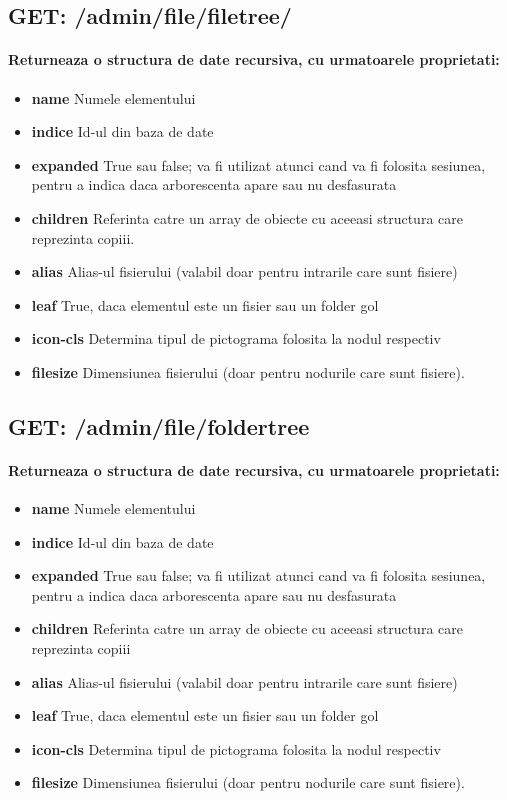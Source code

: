  \subsection*{GET: /admin/file/filetree/}

\paragraph{Returneaza o structura de date recursiva, cu urmatoarele proprietati:}
\begin{itemize}
\item \textbf{name}
 Numele elementului
\item \textbf{indice}
 Id-ul din baza de date
\item \textbf{expanded}
 True sau false; va fi utilizat atunci cand va fi folosita sesiunea, pentru a indica daca arborescenta apare sau nu desfasurata 
\item \textbf{children}
 Referinta catre un array de obiecte cu aceeasi structura care reprezinta copiii.
\item \textbf{alias}
 Alias-ul fisierului (valabil doar pentru intrarile care sunt fisiere)
\item \textbf{leaf}
 True, daca elementul este un fisier sau un folder gol
\item \textbf{icon-cls}
 Determina tipul de pictograma folosita la nodul respectiv
\item \textbf{filesize}
 Dimensiunea fisierului (doar pentru nodurile care sunt fisiere).
 \end{itemize}
 \subsection*{GET: /admin/file/foldertree}

\paragraph{Returneaza o structura de date recursiva, cu urmatoarele proprietati:}
\begin{itemize}
\item \textbf{name}
 Numele elementului
\item \textbf{indice}
 Id-ul din baza de date
\item \textbf{expanded}
 True sau false; va fi utilizat atunci cand va fi folosita sesiunea, pentru a indica daca arborescenta apare sau nu desfasurata 
\item \textbf{children}
 Referinta catre un array de obiecte cu aceeasi structura care reprezinta copiii
\item \textbf{alias}
 Alias-ul fisierului (valabil doar pentru intrarile care sunt fisiere)
\item \textbf{leaf}
 True, daca elementul este un fisier sau un folder gol
\item \textbf{icon-cls}
 Determina tipul de pictograma folosita la nodul respectiv
\item \textbf{filesize}
 Dimensiunea fisierului (doar pentru nodurile care sunt fisiere).
 \end{itemize}
